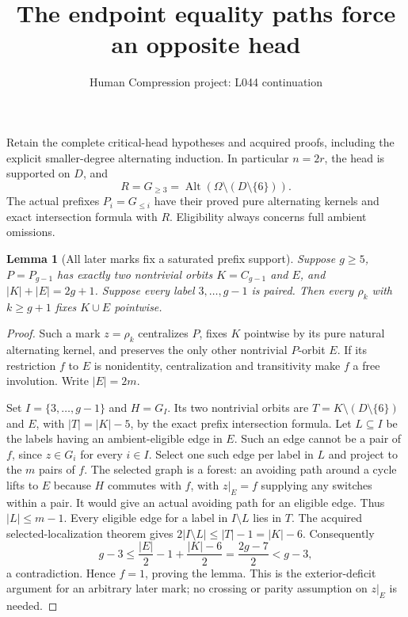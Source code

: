 \documentclass[11pt,a4paper]{article}
\title{The endpoint equality paths force an opposite head}
\author{Human Compression project: L044 continuation}
\date{}
\newtheorem{lemma}{Lemma}
\begin{document}
\maketitle
Retain the complete critical-head hypotheses and acquired proofs,
including the explicit smaller-degree alternating induction. In
particular $n=2r$, the head is supported on $D$, and
\[
 R=G_{\ge3}=\operatorname{Alt}(\Omega\setminus(D\setminus\{6\})).
\]
The actual prefixes $P_i=G_{\le i}$ have their proved pure
alternating kernels and exact intersection formula with $R$.
Eligibility always concerns full ambient omissions.

\begin{lemma}[All later marks fix a saturated prefix support]
\label{fix}
Suppose $g\ge5$, $P=P_{g-1}$ has exactly two nontrivial
orbits $K=C_{g-1}$ and $E$, and
$|K|+|E|=2g+1$. Suppose every label $3,\ldots,g-1$ is paired.
Then every $\rho_k$ with $k\ge g+1$ fixes $K\cup E$ pointwise.
\end{lemma}
\begin{proof}
Such a mark $z=\rho_k$ centralizes $P$, fixes $K$ pointwise
by its pure natural alternating kernel, and preserves the only
other nontrivial $P$-orbit $E$. If its restriction $f$ to $E$
is nonidentity, centralization and transitivity make $f$ a free
involution. Write $|E|=2m$.

Set $I=\{3,\ldots,g-1\}$ and $H=G_I$. Its two nontrivial
orbits are $T=K\setminus(D\setminus\{6\})$ and $E$,
with $|T|=|K|-5$, by the exact prefix intersection formula.
Let $L\subseteq I$ be the labels having an ambient-eligible
edge in $E$. Such an edge cannot be a pair of $f$, since
$z\in G_i$ for every $i\in I$. Select one such edge per
label in $L$ and project to the $m$ pairs of $f$.
The selected graph is a forest: an avoiding path around a
cycle lifts to $E$ because $H$ commutes with $f$, with
$z|_E=f$ supplying any switches within a pair. It would give
an actual avoiding path for an eligible edge. Thus $|L|\le m-1$.
Every eligible edge for a label in $I\setminus L$ lies in $T$.
The acquired selected-localization theorem gives
$2|I\setminus L|\le |T|-1=|K|-6$. Consequently
\[
 g-3\le \frac{|E|}{2}-1+\frac{|K|-6}{2}
             =\frac{2g-7}{2}<g-3,
\]
a contradiction. Hence $f=1$, proving the lemma. This is the
exterior-deficit argument for an arbitrary later mark; no
crossing or parity assumption on $z|_E$ is needed.
\end{proof}
\end{document}
